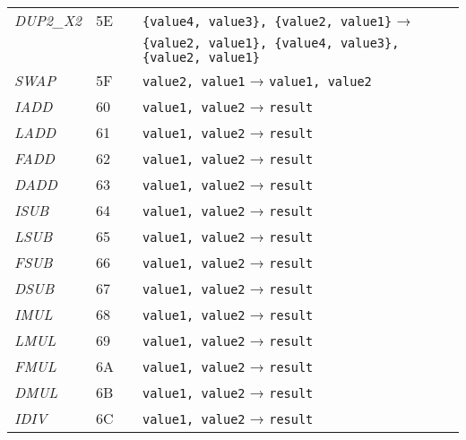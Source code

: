 \begin{center}
\begin{longtable}{ | p{} | p{} | p{} | p{} | }
        \emph{DUP2\_X2}
		& 5E & & \lstinline|{value4, value3}, {value2, value1}| → \\
        & & & \lstinline|{value2, value1}, {value4, value3}, {value2, value1}|
		\\ \hline

        \emph{SWAP}
		& 5F & & \lstinline|value2, value1| → \lstinline|value1, value2|
		\\ \hline
        
        \emph{IADD}
		& 60 & & \lstinline|value1, value2| → \lstinline|result|
		\\ \hline

        \emph{LADD}
		& 61 & & \lstinline|value1, value2| → \lstinline|result|
		\\ \hline

        \emph{FADD}
		& 62 & & \lstinline|value1, value2| → \lstinline|result|
		\\ \hline

        \emph{DADD}
		& 63 & & \lstinline|value1, value2| → \lstinline|result|
		\\ \hline
        
        \emph{ISUB}
		& 64 & & \lstinline|value1, value2| → \lstinline|result|
		\\ \hline

        \emph{LSUB}
		& 65 & & \lstinline|value1, value2| → \lstinline|result|
		\\ \hline

        \emph{FSUB}
		& 66 & & \lstinline|value1, value2| → \lstinline|result|
		\\ \hline

        \emph{DSUB}
		& 67 & & \lstinline|value1, value2| → \lstinline|result|
		\\ \hline
        
        \emph{IMUL}
		& 68 & & \lstinline|value1, value2| → \lstinline|result|
		\\ \hline

        \emph{LMUL}
		& 69 & & \lstinline|value1, value2| → \lstinline|result|
		\\ \hline

        \emph{FMUL}
		& 6A & & \lstinline|value1, value2| → \lstinline|result|
		\\ \hline

        \emph{DMUL}
		& 6B & & \lstinline|value1, value2| → \lstinline|result|
		\\ \hline
        
        \emph{IDIV}
		& 6C & & \lstinline|value1, value2| → \lstinline|result|
		\\ \hline


\end{longtable}
\end{center}
